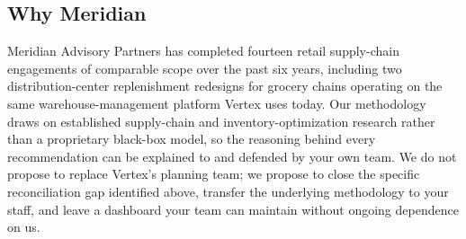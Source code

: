 \subsection{Why Meridian}

Meridian Advisory Partners has completed fourteen retail supply-chain
engagements of comparable scope over the past six years, including two
distribution-center replenishment redesigns for grocery chains operating on
the same warehouse-management platform Vertex uses today. Our methodology
draws on established supply-chain and inventory-optimization research
\cite{chopra2019supply, silver1998inventory} rather than a proprietary
black-box model, so the reasoning behind every recommendation can be
explained to and defended by your own team. We do not propose to
replace Vertex's planning team; we propose to close the specific reconciliation
gap identified above, transfer the underlying methodology to your staff, and
leave a dashboard your team can maintain without ongoing dependence on us.
